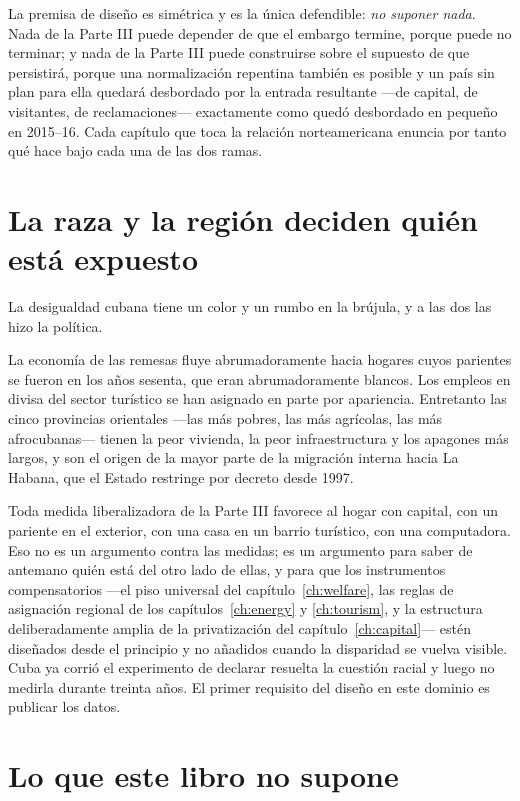 La premisa de diseño es simétrica y es la única defendible: \emph{no suponer nada}.
Nada de la Parte III puede depender de que el embargo termine, porque puede no
terminar; y nada de la Parte III puede construirse sobre el supuesto de que
persistirá, porque una normalización repentina también es posible y un país sin
plan para ella quedará desbordado por la entrada resultante ---de capital, de
visitantes, de reclamaciones--- exactamente como quedó desbordado en pequeño en
2015--16. Cada capítulo que toca la relación norteamericana enuncia por tanto qué
hace bajo cada una de las dos ramas.

\section{La raza y la región deciden quién está expuesto}

La desigualdad cubana tiene un color y un rumbo en la brújula, y a las dos las hizo
la política.

La economía de las remesas fluye abrumadoramente hacia hogares cuyos parientes se
fueron en los años sesenta, que eran abrumadoramente blancos. Los empleos en divisa
del sector turístico se han asignado en parte por apariencia. Entretanto las cinco
provincias orientales ---las más pobres, las más agrícolas, las más
afrocubanas--- tienen la peor vivienda, la peor infraestructura y los apagones más
largos, y son el origen de la mayor parte de la migración interna hacia La Habana,
que el Estado restringe por decreto desde 1997.

Toda medida liberalizadora de la Parte III favorece al hogar con capital, con un
pariente en el exterior, con una casa en un barrio turístico, con una computadora.
Eso no es un argumento contra las medidas; es un argumento para saber de antemano
quién está del otro lado de ellas, y para que los instrumentos compensatorios ---el
piso universal del capítulo~\ref{ch:welfare}, las reglas de asignación regional de
los capítulos~\ref{ch:energy} y \ref{ch:tourism}, y la estructura deliberadamente
amplia de la privatización del capítulo~\ref{ch:capital}--- estén diseñados desde el
principio y no añadidos cuando la disparidad se vuelva visible. Cuba ya corrió el
experimento de declarar resuelta la cuestión racial y luego no medirla durante
treinta años. El primer requisito del diseño en este dominio es publicar los datos.

\section{Lo que este libro no supone}

